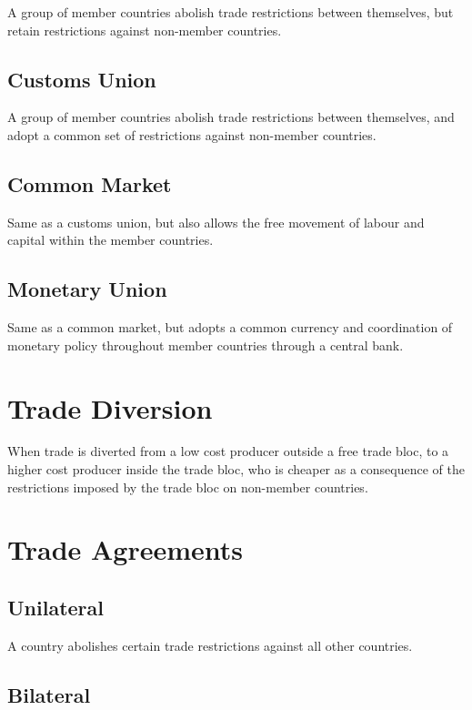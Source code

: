 \documentclass[a4paper,11pt]{article}
\begin{document}
A group of member countries abolish trade restrictions between themselves, but
retain restrictions against non-member countries.


\subsection{Customs Union}

A group of member countries abolish trade restrictions between themselves, and
adopt a common set of restrictions against non-member countries.


\subsection{Common Market}

Same as a customs union, but also allows the free movement of labour and
capital within the member countries.


\subsection{Monetary Union}

Same as a common market, but adopts a common currency and coordination of
monetary policy throughout member countries through a central bank.




\section{Trade Diversion}

When trade is diverted from a low cost producer outside a free trade bloc, to
a higher cost producer inside the trade bloc, who is cheaper as a consequence
of the restrictions imposed by the trade bloc on non-member countries.




\section{Trade Agreements}

\subsection{Unilateral}

A country abolishes certain trade restrictions against all other countries.


\subsection{Bilateral}
\end{document}
